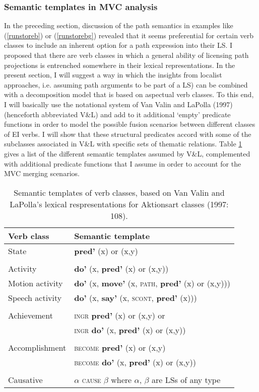 \subsubsection{Semantic templates in MVC analysis} \label{sec:sem-templates}

In the preceding section, discussion of the path semantics in examples like (\ref{runstoreb}) or (\ref{runstorebg}) revealed that it seems preferential for certain verb classes to include an inherent option for a path expression into their LS. I proposed that there are verb classes in which a general ability of licensing path projections is entrenched somewhere in their lexical representations. In the present section, I will suggest a way in which the insights from localist approaches, i.e. assuming path arguments to be part of a LS) can be combined with a decomposition model that is based on aspectual verb classes. To this end, I will basically use the notational system of Van Valin and LaPolla (1997) (henceforth abbreviated V\&L) and add to it additional `empty' predicate functions in order to model the possible fusion scenarios between different classes of EI verbs. I will show that these structural predicates accord with some of the subclasses associated in V\&L with specific sets of thematic relations. Table \ref{table:semtemp} gives a list of the different semantic templates assumed by V\&L, complemented with additional predicate functions that I assume in order to account for the MVC merging scenarios.

\begin{table}


\begin{tabular}{ll}
\hline\hline
\multicolumn{1}{l}{Verb class}&\multicolumn{1}{l}{Semantic template}\tabularnewline
\hline
State&\textbf{pred'} (x) or (x,y)\tabularnewline\tabularnewline
Activity&\textbf{do'} (x, \textbf{pred'} (x) or (x,y))\tabularnewline
Motion activity&\textbf{do'} (x, \textbf{move'} (x, \textsc{path}, \textbf{pred'} (x) or (x,y)))\tabularnewline
Speech activity&\textbf{do'} (x, \textbf{say'} (x, \textsc{scont}, \textbf{pred'} (x)))\tabularnewline\tabularnewline
Achievement&\textsc{ingr} \textbf{pred'} (x) or (x,y) or\tabularnewline
&\textsc{ingr} \textbf{do'} (x, \textbf{pred'} (x) or (x,y))\tabularnewline\tabularnewline
Accomplishment&\textsc{become} \textbf{pred'} (x) or (x,y)\tabularnewline
&\textsc{become} \textbf{do'} (x, \textbf{pred'} (x) or (x,y))\tabularnewline\tabularnewline
Causative&$\alpha$ \textsc{cause} $\beta$ where $\alpha$, $\beta$ are LSs of any type\tabularnewline
\hline
\end{tabular}
\caption[Semantic templates of verb classes, based on Van Valin and LaPolla (1997)]{Semantic templates of verb classes, based on Van Valin and LaPolla's lexical respresentations for Aktionsart classes (1997: 108).}
\label{table:semtemp}

\end{table}

